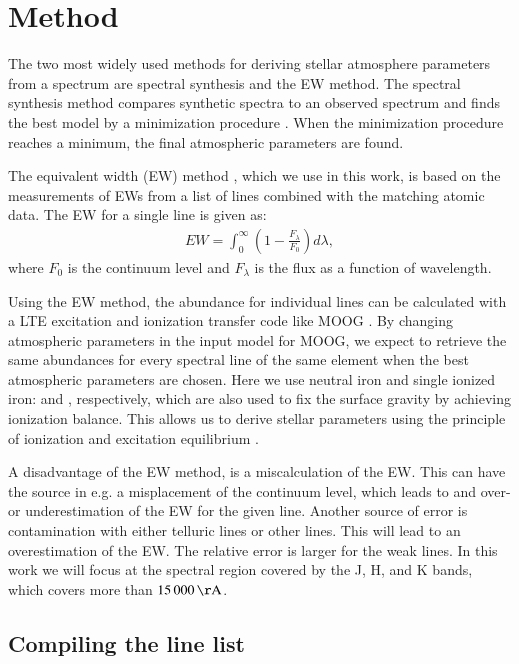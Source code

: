 \documentclass{aa}
\begin{document}
\section{Method}
\label{sec:method}

The two most widely used methods for deriving stellar atmosphere
parameters from a spectrum are spectral synthesis and the EW method.
The spectral synthesis method compares synthetic spectra
to an observed spectrum and finds the best model by a minimization
procedure \citep[see e.g.][]{Valenti2005,Onehag2012,Blanco2014}. When
the minimization procedure reaches a minimum, the final atmospheric
parameters are found.

The equivalent width (EW) method
\citep[see e.g.][]{Sousa2008a,Bensby2014,Mucciarelli2013}, which we use in this
work, is based on the measurements of EWs from a list of lines combined with
the matching atomic data.
The EW for a single line is given as:
\begin{align}
    \label{eq:EW}
    EW = \int_0^\infty \left(1 - \frac{F_\lambda}{F_0}\right) d\lambda,
\end{align}
where $F_0$ is the continuum level and $F_\lambda$ is the flux as a
function of wavelength.

Using the EW method, the abundance for individual lines can be
calculated with a LTE excitation and ionization transfer code like
MOOG \citep{Sneden1973}. By changing atmospheric parameters in the
input model for MOOG, we expect to retrieve the same abundances for
every spectral line of the same element when the best atmospheric
parameters are chosen. Here we use neutral iron and single ionized
iron:  and , respectively, which are also used
to fix the surface gravity by achieving ionization balance. This allows
us to derive stellar parameters using the principle of ionization and
excitation equilibrium \citep{Gray2006}.

A disadvantage of the EW method, is a miscalculation of the EW. This
can have the source in e.g. a misplacement of the continuum level,
which leads to and over- or underestimation of the EW for the given line.
Another source of error is contamination with either telluric lines
or other lines. This will lead to an overestimation of the EW. The
relative error is larger for the weak lines. In this work we
will focus at the spectral region covered by the J, H, and K bands,
which covers more than $\SI{15000}{\AA}$.



\subsection{Compiling the line list}
\end{document}

